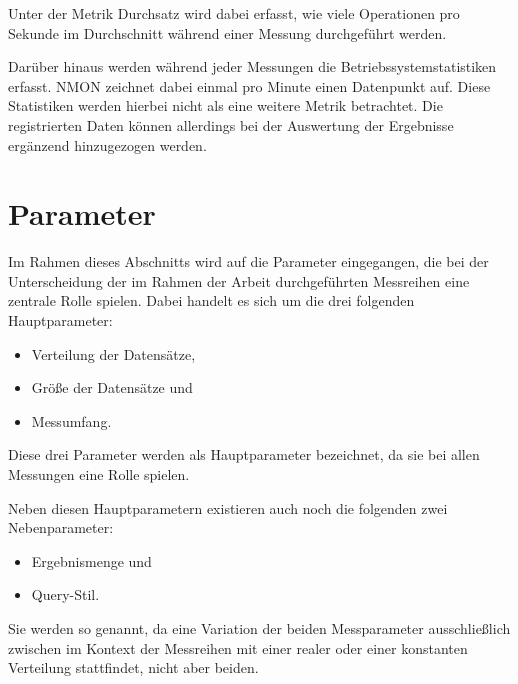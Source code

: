 Unter der Metrik Durchsatz wird dabei erfasst, wie viele Operationen pro Sekunde im Durchschnitt während einer Messung durchgeführt werden. 

Darüber hinaus werden während jeder Messungen die Betriebssystemstatistiken erfasst. NMON zeichnet dabei einmal pro Minute einen Datenpunkt auf. Diese Statistiken werden hierbei nicht als eine weitere Metrik betrachtet. Die registrierten Daten können allerdings bei der Auswertung der Ergebnisse ergänzend hinzugezogen werden.

\section{Parameter}
\label{analyse:parameter}
Im Rahmen dieses Abschnitts wird auf die Parameter eingegangen, die bei der Unterscheidung der im Rahmen der Arbeit durchgeführten Messreihen eine zentrale Rolle spielen. 
Dabei handelt es sich um die drei folgenden Hauptparameter:
\begin{itemize}
    \item Verteilung der Datensätze, 
    \item Größe der Datensätze und 
    \item Messumfang.
\end{itemize}
Diese drei Parameter werden als Hauptparameter bezeichnet, da sie bei allen Messungen eine Rolle spielen.

Neben diesen Hauptparametern existieren auch noch die folgenden zwei Nebenparameter:
\begin{itemize}
    \item Ergebnismenge und 
    \item Query-Stil. 
\end{itemize}
Sie werden so genannt, da eine Variation der beiden Messparameter ausschließlich zwischen im Kontext der Messreihen mit einer realer oder einer konstanten Verteilung stattfindet, nicht aber beiden. 

